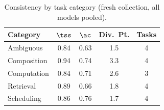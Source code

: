 \begin{table}[t]
\centering
\caption{Consistency by task category (fresh collection, all models pooled).}
\label{tab:category}
\small
\begin{tabular}{lcccc}
\toprule
Category & $\tss$ & $\ac$ & Div.\ Pt. & Tasks \\
\midrule
Ambiguous & 0.84 & 0.63 & 1.5 & 4 \\
Composition & 0.94 & 0.74 & 3.3 & 4 \\
Computation & 0.84 & 0.71 & 2.6 & 3 \\
Retrieval & 0.89 & 0.66 & 1.8 & 4 \\
Scheduling & 0.86 & 0.76 & 1.7 & 4 \\
\bottomrule
\end{tabular}
\end{table}
